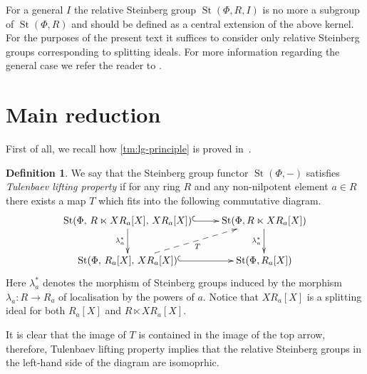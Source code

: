 \documentclass[11pt]{amsart}
\theoremstyle{plain} \declaretheorem[name=Theorem, Refname={Theorem,Theorems}]{tm} \Crefname{tm}{Theorem}{Theorems}
\numberwithin{equation}{section}
\theoremstyle{definition} \newtheorem{df}[lm]{Definition} \Crefname{df}{Definition}{Definitions}
\theoremstyle{remark} \newtheorem{rk}[lm]{Remark} \Crefname{rk}{Remark}{Remarks}
\newcommand{\St}{\mathop{\mathrm{St}}\nolimits}
\begin{document}
For a general $I$ the relative Steinberg group $\St(\Phi, R, I)$ is no more a subgroup of $\St(\Phi, R)$ and should be defined as a central extension of the above kernel.
For the purposes of the present text it suffices to consider only relative Steinberg groups corresponding to splitting ideals.
For more information regarding the general case we refer the reader to \cite[Section~3]{SCh}.

\section{Main reduction} \label{sec:patching}
First of all, we recall how \cref{tm:lg-principle} is proved in~\cite{Tul,SCh}.

\begin{df}
We say that the Steinberg group functor $\St(\Phi, -)$ satisfies {\it Tulenbaev lifting property} if for any ring $R$ and any non-nilpotent element $a \in R$
there exists a map $T$ which fits into the following commutative diagram.
\setcounter{equation}{1}
\begin{equation} \xymatrix{\St(\Phi,\,R\ltimes XR_a[X],\,XR_a[X]) \ar@{^{(}->}[r] \ar[d]_-{\lambda_a^*} & \St(\Phi, R \ltimes XR_a[X]) \ar[d]_-{\lambda_a^*} \\
                           \St(\Phi,\,R_a[X],\,XR_a[X]) \ar@{-->}[ru]_-{T} \ar@{^{(}->}[r] & \St(\Phi, R_a[X])} \label{eq:diagram} \end{equation}
Here $\lambda_a^*$ denotes the morphism of Steinberg groups induced by the morphism $\lambda_a\colon R \to R_a$ of localisation by the powers of $a$.                           
Notice that $XR_a[X]$ is a splitting ideal for both $R_a[X]$ and $R \ltimes XR_a[X]$.
\end{df}
It is clear that the image of $T$ is contained in the image of the top arrow, therefore, Tulenbaev lifting property implies that the relative Steinberg groups in the left-hand side of the diagram are isomoprhic.
\end{document}
